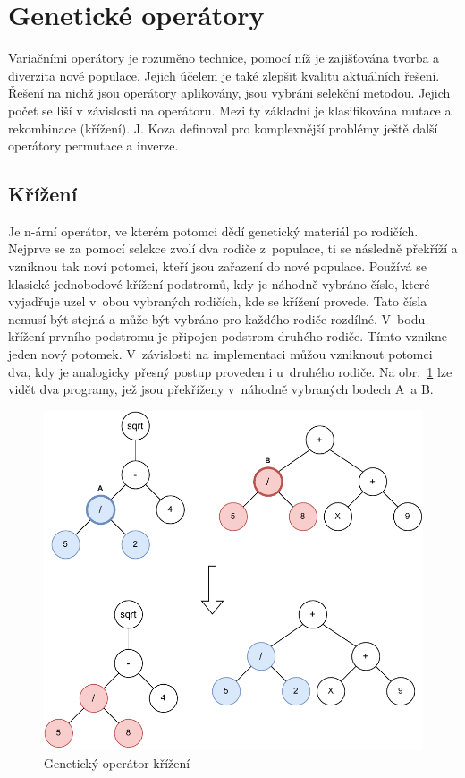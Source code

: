 \section{Genetické operátory}
Variačními operátory je rozuměno technice, pomocí níž je zajišťována tvorba a diverzita nové populace. Jejich účelem je také zlepšit kvalitu aktuálních řešení. Řešení na nichž jsou operátory aplikovány, jsou vybráni selekční metodou. Jejich počet se liší v závislosti na operátoru. Mezi ty základní je klasifikována mutace a rekombinace (křížení). J. Koza definoval pro komplexnější problémy ještě další operátory permutace a inverze. 

\subsection{Křížení}
Je n-ární operátor, ve kterém potomci dědí genetický materiál po rodičích. Nejprve se za pomocí selekce zvolí dva rodiče z~populace, ti se následně překříží a vzniknou tak noví potomci, kteří jsou zařazení do nové populace. Používá se  klasické jednobodové křížení podstromů, kdy je náhodně vybráno číslo, které vyjadřuje uzel v~obou vybraných rodičích, kde se křížení provede. Tato čísla nemusí být stejná a může být vybráno pro každého rodiče rozdílné. V~bodu křížení prvního podstromu je připojen podstrom druhého rodiče. Tímto vznikne jeden nový potomek. V~závislosti na implementaci můžou vzniknout potomci dva, kdy je analogicky přesný postup proveden i u~druhého rodiče. Na obr.~\ref{fig:tgp-crossover} lze vidět dva programy, jež jsou překříženy v~náhodně vybraných bodech A~a B. \\

\vspace{0.5cm} 
\begin{figure}[h!]
    \centering
    \includegraphics[scale=1]{obrazky-figures/tgp-crossover.pdf}
    \caption{Genetický operátor křížení}
    \label{fig:tgp-crossover}
\end{figure} 
\vspace{0.5cm}

